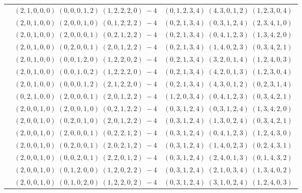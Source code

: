 \documentclass[11pt]{article}
\begin{document}
\begin{longtable}[l]{|c|c|c|}
 \cline{2-3} 
 & $(2 ,1 ,0 ,0 ,0) \;(0 ,0 ,0 ,1 ,2) \;(1 ,2 ,2 ,2 ,0) \;-4$ & $(0 ,1 ,2 ,3 ,4) \;(4 ,3 ,0 ,1 ,2) \;(1 ,2 ,3 ,0 ,4) \;$\\ 
 \cline{2-3} 
 & $(2 ,0 ,1 ,0 ,0) \;(2 ,0 ,0 ,1 ,0) \;(0 ,1 ,2 ,2 ,2) \;-4$ & $(0 ,2 ,1 ,3 ,4) \;(0 ,3 ,1 ,2 ,4) \;(2 ,3 ,4 ,1 ,0) \;$\\ 
 \cline{2-3} 
 & $(2 ,0 ,1 ,0 ,0) \;(2 ,0 ,0 ,0 ,1) \;(0 ,2 ,1 ,2 ,2) \;-4$ & $(0 ,2 ,1 ,3 ,4) \;(0 ,4 ,1 ,2 ,3) \;(1 ,3 ,4 ,2 ,0) \;$\\ 
 \cline{2-3} 
 & $(2 ,0 ,1 ,0 ,0) \;(0 ,2 ,0 ,0 ,1) \;(2 ,0 ,1 ,2 ,2) \;-4$ & $(0 ,2 ,1 ,3 ,4) \;(1 ,4 ,0 ,2 ,3) \;(0 ,3 ,4 ,2 ,1) \;$\\ 
 \cline{2-3} 
 & $(2 ,0 ,1 ,0 ,0) \;(0 ,0 ,1 ,2 ,0) \;(1 ,2 ,2 ,0 ,2) \;-4$ & $(0 ,2 ,1 ,3 ,4) \;(3 ,2 ,0 ,1 ,4) \;(1 ,2 ,4 ,0 ,3) \;$\\ 
 \cline{2-3} 
 & $(2 ,0 ,1 ,0 ,0) \;(0 ,0 ,1 ,0 ,2) \;(1 ,2 ,2 ,2 ,0) \;-4$ & $(0 ,2 ,1 ,3 ,4) \;(4 ,2 ,0 ,1 ,3) \;(1 ,2 ,3 ,0 ,4) \;$\\ 
 \cline{2-3} 
 & $(2 ,0 ,1 ,0 ,0) \;(0 ,0 ,0 ,1 ,2) \;(2 ,1 ,2 ,2 ,0) \;-4$ & $(0 ,2 ,1 ,3 ,4) \;(4 ,3 ,0 ,1 ,2) \;(0 ,2 ,3 ,1 ,4) \;$\\ 
 \cline{2-3} 
 & $(0 ,2 ,1 ,0 ,0) \;(2 ,0 ,0 ,0 ,1) \;(2 ,0 ,1 ,2 ,2) \;-4$ & $(1 ,2 ,0 ,3 ,4) \;(0 ,4 ,1 ,2 ,3) \;(0 ,3 ,4 ,2 ,1) \;$\\ 
 \cline{2-3} 
 & $(2 ,0 ,0 ,1 ,0) \;(2 ,0 ,0 ,1 ,0) \;(0 ,2 ,1 ,2 ,2) \;-4$ & $(0 ,3 ,1 ,2 ,4) \;(0 ,3 ,1 ,2 ,4) \;(1 ,3 ,4 ,2 ,0) \;$\\ 
 \cline{2-3} 
 & $(2 ,0 ,0 ,1 ,0) \;(0 ,2 ,0 ,1 ,0) \;(2 ,0 ,1 ,2 ,2) \;-4$ & $(0 ,3 ,1 ,2 ,4) \;(1 ,3 ,0 ,2 ,4) \;(0 ,3 ,4 ,2 ,1) \;$\\ 
 \cline{2-3} 
 & $(2 ,0 ,0 ,1 ,0) \;(2 ,0 ,0 ,0 ,1) \;(0 ,2 ,2 ,1 ,2) \;-4$ & $(0 ,3 ,1 ,2 ,4) \;(0 ,4 ,1 ,2 ,3) \;(1 ,2 ,4 ,3 ,0) \;$\\ 
 \cline{2-3} 
 & $(2 ,0 ,0 ,1 ,0) \;(0 ,2 ,0 ,0 ,1) \;(2 ,0 ,2 ,1 ,2) \;-4$ & $(0 ,3 ,1 ,2 ,4) \;(1 ,4 ,0 ,2 ,3) \;(0 ,2 ,4 ,3 ,1) \;$\\ 
 \cline{2-3} 
 & $(2 ,0 ,0 ,1 ,0) \;(0 ,0 ,2 ,0 ,1) \;(2 ,2 ,0 ,1 ,2) \;-4$ & $(0 ,3 ,1 ,2 ,4) \;(2 ,4 ,0 ,1 ,3) \;(0 ,1 ,4 ,3 ,2) \;$\\ 
 \cline{2-3} 
 & $(2 ,0 ,0 ,1 ,0) \;(0 ,1 ,2 ,0 ,0) \;(1 ,2 ,0 ,2 ,2) \;-4$ & $(0 ,3 ,1 ,2 ,4) \;(2 ,1 ,0 ,3 ,4) \;(1 ,3 ,4 ,0 ,2) \;$\\ 
 \cline{2-3} 
 & $(2 ,0 ,0 ,1 ,0) \;(0 ,1 ,0 ,2 ,0) \;(1 ,2 ,2 ,0 ,2) \;-4$ & $(0 ,3 ,1 ,2 ,4) \;(3 ,1 ,0 ,2 ,4) \;(1 ,2 ,4 ,0 ,3) \;$\\ 

\end{longtable}
\end{document}

